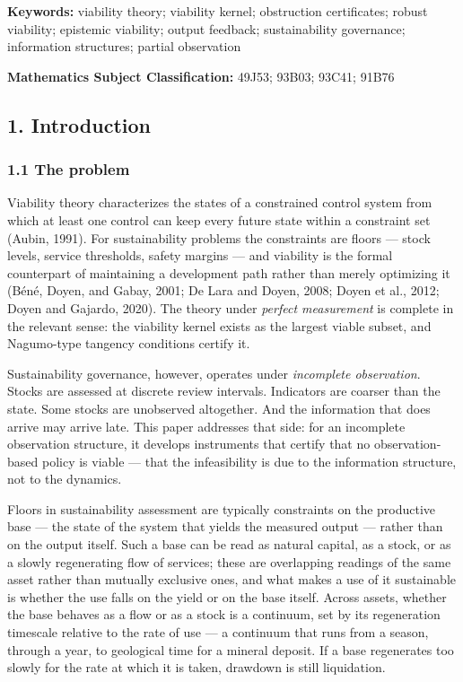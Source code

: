 \documentclass[10pt,twocolumn]{article}
\theoremstyle{definition}
\begin{document}
\textbf{Keywords:} viability theory; viability kernel; obstruction
certificates; robust viability; epistemic viability; output feedback;
sustainability governance; information structures; partial observation

\textbf{Mathematics Subject Classification:} 49J53; 93B03; 93C41; 91B76

\subsection{1. Introduction}\label{introduction}

\subsubsection{1.1 The problem}\label{the-problem}

Viability theory characterizes the states of a constrained control system from which at least one control can keep every future state within a constraint set (Aubin, 1991). For sustainability problems the constraints are floors --- stock levels, service thresholds, safety margins --- and viability is the formal counterpart of maintaining a development path rather than merely optimizing it (B\'en\'e, Doyen, and Gabay, 2001; De Lara and Doyen, 2008;
Doyen et al., 2012; Doyen and Gajardo, 2020). The theory under
\emph{perfect measurement} is complete in the relevant sense: the
viability kernel exists as the largest viable subset, and Nagumo-type
tangency conditions certify it.

Sustainability governance, however, operates under \emph{incomplete
observation}. Stocks are assessed at discrete review intervals.
Indicators are coarser than the state. Some stocks are unobserved
altogether. And the information that does arrive may arrive late. This paper addresses that side: for an incomplete observation structure, it develops instruments that certify that no observation-based policy is viable --- that the infeasibility is due to the information structure, not to the dynamics.

Floors in sustainability assessment are typically constraints on the
productive base --- the state of the system that yields the measured
output --- rather than on the output itself. Such a base can be read as
natural capital, as a stock, or as a slowly regenerating flow of
services; these are overlapping readings of the same asset rather than
mutually exclusive ones, and what makes a use of it sustainable is
whether the use falls on the yield or on the base itself. Across
assets, whether the base behaves as a flow or as a stock is a
continuum, set by its regeneration timescale relative to the rate of
use --- a continuum that runs from a season, through a year, to
geological time for a mineral deposit. If a base regenerates too
slowly for the rate at which it is taken, drawdown is still
liquidation.
\end{document}
